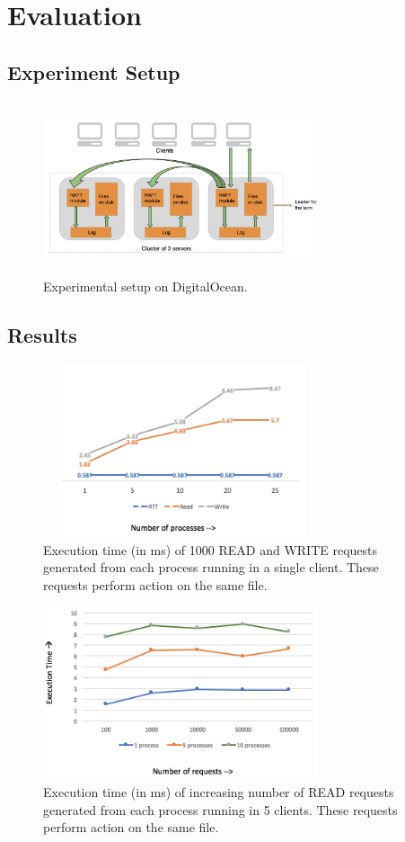 \section{Evaluation}

\subsection{Experiment Setup}

\begin{figure}
\centering
\includegraphics[height=2in, width=3.2in]{images/SystemModel.png}
\caption{Experimental setup on DigitalOcean.}
\end{figure}


\subsection{Results}

\begin{figure}
\centering
\includegraphics[height=2in, width=3.2in]{images/F_OneClient.png}
\caption{Execution time (in ms) of 1000 READ and WRITE requests generated from each process running in a single client. These requests perform action on the same file.}
\end{figure}

\begin{figure}
\centering
\includegraphics[height=2in, width=3.2in]{images/F-HC-SF-R.png}
\caption{Execution time (in ms) of increasing number of READ requests generated from each process running in 5 clients. These requests perform action on the same file.}
\end{figure}

